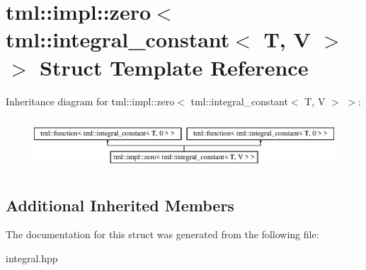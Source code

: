 \hypertarget{structtml_1_1impl_1_1zero_3_01tml_1_1integral__constant_3_01T_00_01V_01_4_01_4}{\section{tml\+:\+:impl\+:\+:zero$<$ tml\+:\+:integral\+\_\+constant$<$ T, V $>$ $>$ Struct Template Reference}
\label{structtml_1_1impl_1_1zero_3_01tml_1_1integral__constant_3_01T_00_01V_01_4_01_4}
}
Inheritance diagram for tml\+:\+:impl\+:\+:zero$<$ tml\+:\+:integral\+\_\+constant$<$ T, V $>$ $>$\+:\begin{figure}[H]
\begin{center}
\leavevmode
\includegraphics[height=1.971831cm]{structtml_1_1impl_1_1zero_3_01tml_1_1integral__constant_3_01T_00_01V_01_4_01_4}
\end{center}
\end{figure}
\subsection*{Additional Inherited Members}


The documentation for this struct was generated from the following file\+:\begin{DoxyCompactItemize}
\item 
integral.\+hpp\end{DoxyCompactItemize}

